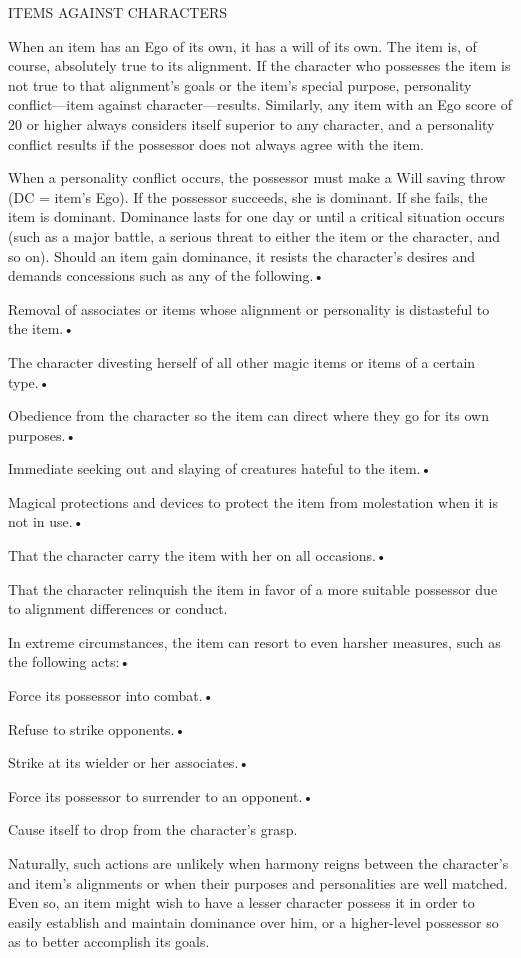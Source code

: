 \vspace{12pt}
ITEMS AGAINST CHARACTERS

When an item has an Ego of its own, it has a will of its own. The item is, of course, 
absolutely true to its alignment. If the character who possesses the item is not 
true to that alignment's goals or the item's special purpose, personality conflict---item 
against character---results. Similarly, any item with an Ego score of 20 or higher 
always considers itself superior to any character, and a personality conflict results 
if the possessor does not always agree with the item.

When a personality conflict occurs, the possessor must make a Will saving throw 
(DC = item's Ego). If the possessor succeeds, she is dominant. If she fails, the 
item is dominant. Dominance lasts for one day or until a critical situation occurs 
(such as a major battle, a serious threat to either the item or the character, 
and so on). Should an item gain dominance, it resists the character's desires and 
demands concessions such as any of the following.•

Removal of associates or items whose alignment or personality is distasteful to 
the item.•

The character divesting herself of all other magic items or items of a certain 
type.•

Obedience from the character so the item can direct where they go for its own purposes.•

Immediate seeking out and slaying of creatures hateful to the item.•

Magical protections and devices to protect the item from molestation when it is 
not in use.•

That the character carry the item with her on all occasions.•

That the character relinquish the item in favor of a more suitable possessor due 
to alignment differences or conduct.

In extreme circumstances, the item can resort to even harsher measures, such as 
the following acts:•

Force its possessor into combat.•

Refuse to strike opponents.•

Strike at its wielder or her associates.•

Force its possessor to surrender to an opponent.•

Cause itself to drop from the character's grasp.

\vspace{12pt}
Naturally, such actions are unlikely when harmony reigns between the character's 
and item's alignments or when their purposes and personalities are well matched. 
Even so, an item might wish to have a lesser character possess it in order to easily 
establish and maintain dominance over him, or a higher-level possessor so as to 
better accomplish its goals.

